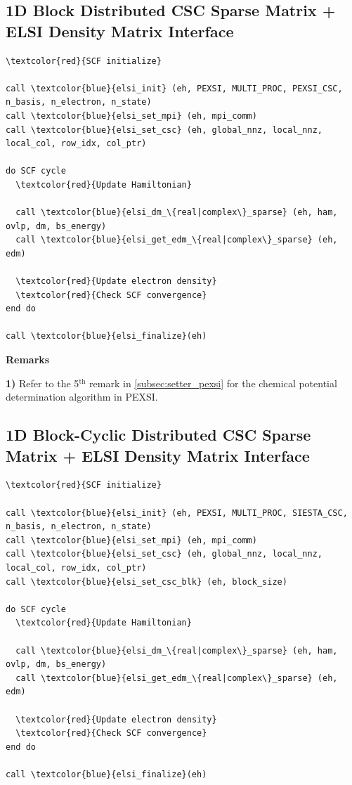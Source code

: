 \documentclass{report}
\begin{document}
\subsection*{1D Block Distributed CSC Sparse Matrix + ELSI Density Matrix Interface}
\begin{tcolorbox}
\begin{Verbatim}[commandchars=\\\{\}]
\textcolor{red}{SCF initialize}

call \textcolor{blue}{elsi_init} (eh, PEXSI, MULTI_PROC, PEXSI_CSC, n_basis, n_electron, n_state)
call \textcolor{blue}{elsi_set_mpi} (eh, mpi_comm)
call \textcolor{blue}{elsi_set_csc} (eh, global_nnz, local_nnz, local_col, row_idx, col_ptr)

do SCF cycle
  \textcolor{red}{Update Hamiltonian}

  call \textcolor{blue}{elsi_dm_\{real|complex\}_sparse} (eh, ham, ovlp, dm, bs_energy)
  call \textcolor{blue}{elsi_get_edm_\{real|complex\}_sparse} (eh, edm)

  \textcolor{red}{Update electron density}
  \textcolor{red}{Check SCF convergence}
end do

call \textcolor{blue}{elsi_finalize}(eh)
\end{Verbatim}
\end{tcolorbox}

\textbf{Remarks}

\textbf{1)} Refer to the 5$^\text{th}$ remark in \ref{subsec:setter_pexsi} for the chemical potential determination algorithm in PEXSI.

\subsection*{1D Block-Cyclic Distributed CSC Sparse Matrix + ELSI Density Matrix Interface}
\begin{tcolorbox}
\begin{Verbatim}[commandchars=\\\{\}]
\textcolor{red}{SCF initialize}

call \textcolor{blue}{elsi_init} (eh, PEXSI, MULTI_PROC, SIESTA_CSC, n_basis, n_electron, n_state)
call \textcolor{blue}{elsi_set_mpi} (eh, mpi_comm)
call \textcolor{blue}{elsi_set_csc} (eh, global_nnz, local_nnz, local_col, row_idx, col_ptr)
call \textcolor{blue}{elsi_set_csc_blk} (eh, block_size)

do SCF cycle
  \textcolor{red}{Update Hamiltonian}

  call \textcolor{blue}{elsi_dm_\{real|complex\}_sparse} (eh, ham, ovlp, dm, bs_energy)
  call \textcolor{blue}{elsi_get_edm_\{real|complex\}_sparse} (eh, edm)

  \textcolor{red}{Update electron density}
  \textcolor{red}{Check SCF convergence}
end do

call \textcolor{blue}{elsi_finalize}(eh)
\end{Verbatim}
\end{tcolorbox}
\end{document}
